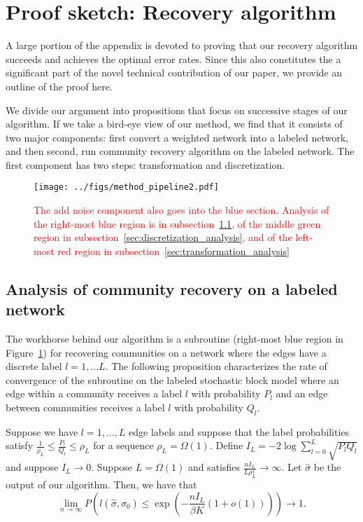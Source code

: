 \documentclass{article}
\begin{document}
\section{Proof sketch: Recovery algorithm}
\label{SecProofs}

A large portion of the appendix is devoted to proving that our recovery algorithm succeeds and achieves the optimal error rates. Since this also constitutes the a significant part of the novel technical contribution of our paper, we provide an outline of the proof here. 

We divide our argument into propositions that focus on successive stages of our algorithm. If we take a bird-eye view of our method, we find that it consists of two major components: first convert a weighted network into a labeled network, and then second, run community recovery algorithm on the labeled network. The first component has two steps: transformation and discretization. 

\begin{figure}[htp]
\centering
\texttt{[image: ../figs/method\_pipeline2.pdf]}
\caption{\textcolor{red}{The add noise component also goes into the blue section. Analysis of the right-most blue region is in subsection~\ref{sec:labeled_sbm_analysis}, of the middle green region in subsection~\ref{sec:discretization_analysis}, and of the left-most red region in subsection~\ref{sec:transformation_analysis}}}
\label{fig:method_pipeline1}
\end{figure}


\subsection{Analysis of community recovery on a labeled network}
\label{sec:labeled_sbm_analysis}

The workhorse behind our algorithm is a subroutine (right-most blue region in Figure~\ref{fig:method_pipeline1}) for recovering communities on a network where the edges have a discrete label $l=1,...L$. The following proposition characterizes the rate of convergence of the subroutine on the labeled stochastic block model where an edge within a community receives a label $l$ with probability $P_l$ and an edge between communities receives a label $l$ with probability $Q_l$. 


\begin{proposition}
\label{prop:labeled_sbm_rate}
Suppose we have $l=1,...,L$ edge labels and suppose that the label probabilities satisfy $\frac{1}{\rho_L} \leq \frac{P_l}{Q_l} \leq \rho_L$ for a sequence $\rho_L = \Omega(1)$. Define $I_L = -2 \log \sum_{l=0}^L \sqrt{P_l Q_l}$ and suppose $I_L \rightarrow 0$.  Suppose $L = \Omega(1)$ and satisfies $\frac{n I_L}{L \rho^4_L} \rightarrow \infty$. Let $\hat{\sigma}$ be the output of our algorithm. Then, we have that
\[
\lim_{n \rightarrow \infty} P \left( l(\hat{\sigma}, \sigma_0) \leq \exp \left( - \frac{ n I_L}{ \beta K} (1 + o(1)) \right) \right) \rightarrow 1.
\]
\end{proposition}
\end{document}

